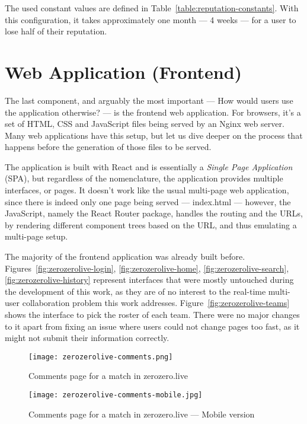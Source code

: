 The used constant values are defined in Table~\ref{table:reputation-constants}. With this configuration, it takes approximately one month --- 4 weeks --- for a user to lose half of their reputation.

\section{Web Application (Frontend)}

The last component, and arguably the most important --- How would users use the application otherwise? --- is the frontend web application. For browsers, it's a set of HTML, CSS and JavaScript files being served by an Nginx web server. Many web applications have this setup, but let us dive deeper on the process that happens before the generation of those files to be served.

The application is built with React and is essentially a \textit{Single Page Application} (SPA), but regardless of the nomenclature, the application provides multiple interfaces, or pages. It doesn't work like the usual multi-page web application, since there is indeed only one page being served --- index.html --- however, the JavaScript, namely the React Router package, handles the routing and the URLs, by rendering different component trees based on the URL, and thus emulating a multi-page setup.

The majority of the frontend application was already built before. Figures~\ref{fig:zerozerolive-login}, \ref{fig:zerozerolive-home}, \ref{fig:zerozerolive-search}, \ref{fig:zerozerolive-history} represent interfaces that were mostly untouched during the development of this work, as they are of no interest to the real-time multi-user collaboration problem this work addresses. Figure~\ref{fig:zerozerolive-teams} shows the interface to pick the roster of each team. There were no major changes to it apart from fixing an issue where users could not change pages too fast, as it might not submit their information correctly.

\begin{figure}[h]
    \begin{center}
        \leavevmode
        \texttt{[image: zerozerolive-comments.png]}
        \caption{Comments page for a match in zerozero.live}
        \label{fig:zerozerolive-comments}
    \end{center}
\end{figure}

\begin{figure}[h]
    \begin{center}
        \leavevmode
        \texttt{[image: zerozerolive-comments-mobile.jpg]}
        \caption{Comments page for a match in zerozero.live --- Mobile version}
        \label{fig:zerozerolive-comments-mobile}
    \end{center}
\end{figure}

